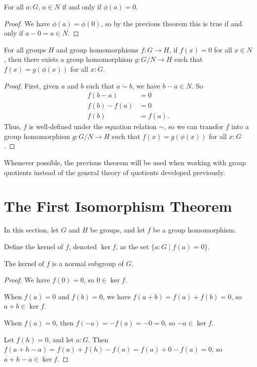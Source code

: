 \documentclass[../../math.tex]{subfiles}
\begin{document}
\begin{theorem} \label{to_qgroup_zero}
    For all $a : G$, $a \in N$ if and only if $\phi(a) = 0$.
\end{theorem}
\begin{proof}
    We have $\phi(a) = \phi(0)$, so by the previous theorem this is true if and
    only if $a - 0 = a \in N$.
\end{proof}

\begin{theorem} \label{qgroup_f_ex}
    For all groups $H$ and group homomorphisms $f : G \to H$, if $f(x) = 0$ for
    all $x \in N$, then there exists a group homomorphism $g : G/N \to H$ such
    that $f(x) = g(\phi(x))$ for all $x : G$.
\end{theorem}
\begin{proof}
    First, given $a$ and $b$ such that $a \sim b$, we have $b - a \in N$.  So
    \begin{align*}
        f(b - a) &= 0 \\
        f(b) - f(a) &= 0 \\
        f(b) &= f(a).
    \end{align*}
    Thus, $f$ is well-defined under the equation relation $\sim$, so we can
    transfor $f$ into a group homomorphism $g : G/N \to H$ such that $f(x) =
    g(\phi(x))$ for all $x : G$.
\end{proof}

Whenever possible, the previous theorem will be used when working with group
quotients instead of the general theory of quotients developed previously.

\section{The First Isomorphism Theorem}

In this section, let $G$ and $H$ be groups, and let $f$ be a group homomorphism.

\begin{definition}
    Define the kernel of $f$, denoted $\ker f$, as the set $\{a : G \mid f(a) =
    0\}$.
\end{definition}

\begin{theorem}
    The kernel of $f$ is a normal subgroup of $G$.
\end{theorem}
\begin{proof}
    We have $f(0) = 0$, so $0 \in \ker f$.

    When $f(a) = 0$ and $f(b) = 0$, we have $f(a + b) = f(a) + f(b) = 0$, so $a
    + b \in \ker f$.

    When $f(a) = 0$, then $f(-a) = -f(a) = -0 = 0$, so $-a \in \ker f$.

    Let $f(h) = 0$, and let $a : G$.  Then $f(a + h - a) = f(a) + f(h) - f(a) =
    f(a) + 0 - f(a) = 0$, so $a + h - a \in \ker f$.
\end{proof}
\end{document}
